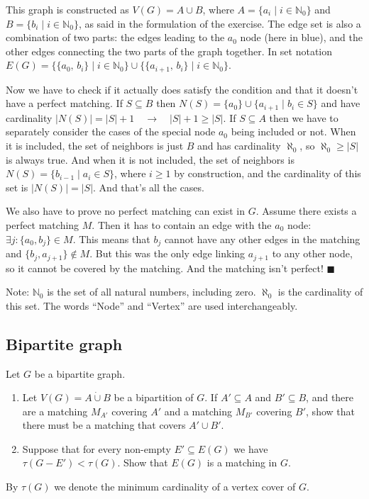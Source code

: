 \documentclass{article}
\newcommand{\N}{\mathbb{N}}
\begin{document}
  This graph is constructed as $V(G) = A \cup B$, where $A = \{a_i \mid i \in \N_0\}$ and $B = \{b_i \mid i \in \N_0\}$,
  as said in the formulation of the exercise.
  The edge set is also a combination of two parts: the edges leading to the $a_0$ node (here in blue),
  and the other edges connecting the two parts of the graph together.
  In set notation
  $E(G) = \{\{a_0,\, b_i\} \mid i \in \N_0 \} \cup \{\{a_{i+1},\, b_i\} \mid i \in \N_0 \}$.

  Now we have to check if it actually does satisfy the condition and that it doesn't have a perfect matching.
  If $S \subseteq B$ then $N(S) = \{a_0\} \cup \{a_{i+1} \mid b_i \in S\}$ and have cardinality
  $|N(S)| = |S|+1 \quad\to\quad |S|+1 \geq |S|$.
  If $S \subseteq A$ then we have to separately consider the cases of the special node $a_0$ being included or not.
  When it is included, the set of neighbors is just $B$ and has cardinality $\aleph_0$, so $\aleph_0 \geq |S|$ is always true.
  And when it is not included, the set of neighbors is $N(S) = \{b_{i-1} \mid a_i \in S\}$, where $i \geq 1$ by construction,
  and the cardinality of this set is $|N(S)| = |S|$.
  And that's all the cases.

  We also have to prove no perfect matching can exist in $G$.
  Assume there exists a perfect matching $M$.
  Then it has to contain an edge with the $a_0$ node: $\exists j : \{a_0, b_j\} \in M$.
  This means that $b_j$ cannot have any other edges in the matching and $\{b_j, a_{j+1}\} \notin M$.
  But this was the only edge linking $a_{j+1}$ to any other node, so it cannot be covered by the matching.
  And the matching isn't perfect!
  $\blacksquare$

  Note: $\N_0$ is the set of all natural numbers, including zero. $\aleph_0$ is the cardinality of this set.
  The words ``Node'' and ``Vertex'' are used interchangeably.

  \subsection{Bipartite graph}
  \begin{centerframebox}
    Let $G$ be a bipartite graph.

    \begin{enumerate}[label=(\alph*)]
      \item
      Let $V(G) = A \dot\cup B$ be a bipartition of $G$.
      If $A' \subseteq A$ and $B' \subseteq B$, and there are a matching $M_{A'}$ covering $A'$ and a
      matching $M_{B'}$ covering $B'$, show that there must be a matching that covers $A' \cup B'$.

      \item
      Suppose that for every non-empty $E' \subseteq E(G)$ we have $\tau(G - E') < \tau(G)$.
      Show that $E(G)$ is a matching in $G$.
    \end{enumerate}

    By $\tau(G)$ we denote the minimum cardinality of a vertex cover of $G$.
  \end{centerframebox}
\end{document}
